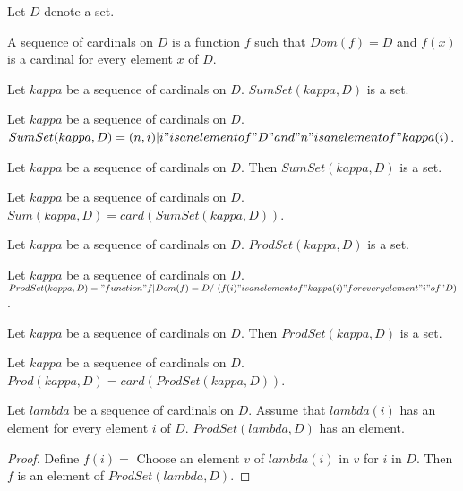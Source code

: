 \documentclass{article}
\begin{document}
  \begin{forthel}
    Let $D$ denote a set.

    \begin{definition}
      A sequence of cardinals on $D$ is a function $f$ such that $Dom(f) = D$ and $f(x)$ is a cardinal for every element $x$ of $D$.
    \end{definition}

    \begin{signature}
      Let $kappa$ be a sequence of cardinals on $D$. $SumSet(kappa,D)$ is a set.
    \end{signature}

    \begin{axiom}[SumDef]
      Let $kappa$ be a sequence of cardinals on $D$. $SumSet(kappa,D) = {(n,i) | i "is an element of" D "and" n "is an element of" kappa(i)}$.
    \end{axiom}

    \begin{axiom}
      Let $kappa$ be a sequence of cardinals on $D$. Then $SumSet(kappa,D)$ is a set.
    \end{axiom}

    \begin{definition}
      Let $kappa$ be a sequence of cardinals on $D$. $Sum(kappa,D) = card(SumSet(kappa,D))$.
    \end{definition}

    \begin{signature}
      Let $kappa$ be a sequence of cardinals on $D$. $ProdSet(kappa,D)$ is a set.
    \end{signature}

    \begin{axiom}[ProdDef]
      Let $kappa$ be a sequence of cardinals on $D$. $ProdSet(kappa,D) = {"function" f | Dom(f) = D /\ (f(i) "is an element of" kappa(i) "for every
      element" i "of" D)}$.
    \end{axiom}

    \begin{axiom}
      Let $kappa$ be a sequence of cardinals on $D$. Then $ProdSet(kappa,D)$ is a set.
    \end{axiom}

    \begin{definition}
      Let $kappa$ be a sequence of cardinals on $D$. $Prod(kappa,D) = card(ProdSet(kappa,D))$.
    \end{definition}


    \begin{lemma}[Choice]
      Let $lambda$ be a sequence of cardinals on $D$. Assume that $lambda(i)$ has an element for every element $i$ of $D$. $ProdSet(lambda, D)$ has an element.
    \end{lemma}
    \begin{proof}
      Define $f(i) =$ Choose an element $v$ of $lambda(i)$ in $v$ for $i$ in $D$. Then $f$ is an element of $ProdSet(lambda,D)$.
    \end{proof}
  \end{forthel}
\end{document}
